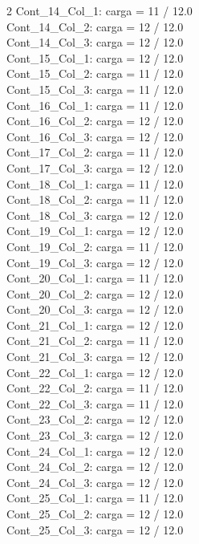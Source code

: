 \begin{multicols}{2}
Cont\_14\_Col\_1: carga = 11 / 12.0\\
Cont\_14\_Col\_2: carga = 12 / 12.0\\
Cont\_14\_Col\_3: carga = 12 / 12.0\\
Cont\_15\_Col\_1: carga = 12 / 12.0\\
Cont\_15\_Col\_2: carga = 11 / 12.0\\
Cont\_15\_Col\_3: carga = 11 / 12.0\\
Cont\_16\_Col\_1: carga = 11 / 12.0\\
Cont\_16\_Col\_2: carga = 12 / 12.0\\
Cont\_16\_Col\_3: carga = 12 / 12.0\\
Cont\_17\_Col\_2: carga = 11 / 12.0\\
Cont\_17\_Col\_3: carga = 12 / 12.0\\
Cont\_18\_Col\_1: carga = 11 / 12.0\\
Cont\_18\_Col\_2: carga = 11 / 12.0\\
Cont\_18\_Col\_3: carga = 12 / 12.0\\
Cont\_19\_Col\_1: carga = 12 / 12.0\\
Cont\_19\_Col\_2: carga = 11 / 12.0\\
Cont\_19\_Col\_3: carga = 12 / 12.0\\
Cont\_20\_Col\_1: carga = 11 / 12.0\\
Cont\_20\_Col\_2: carga = 12 / 12.0\\
Cont\_20\_Col\_3: carga = 12 / 12.0\\
Cont\_21\_Col\_1: carga = 12 / 12.0\\
Cont\_21\_Col\_2: carga = 11 / 12.0\\
Cont\_21\_Col\_3: carga = 12 / 12.0\\
Cont\_22\_Col\_1: carga = 12 / 12.0\\
Cont\_22\_Col\_2: carga = 11 / 12.0\\
Cont\_22\_Col\_3: carga = 11 / 12.0\\
Cont\_23\_Col\_2: carga = 12 / 12.0\\
Cont\_23\_Col\_3: carga = 12 / 12.0\\
Cont\_24\_Col\_1: carga = 12 / 12.0\\
Cont\_24\_Col\_2: carga = 12 / 12.0\\
Cont\_24\_Col\_3: carga = 12 / 12.0\\
Cont\_25\_Col\_1: carga = 11 / 12.0\\
Cont\_25\_Col\_2: carga = 12 / 12.0\\
Cont\_25\_Col\_3: carga = 12 / 12.0\\

\end{multicols}
